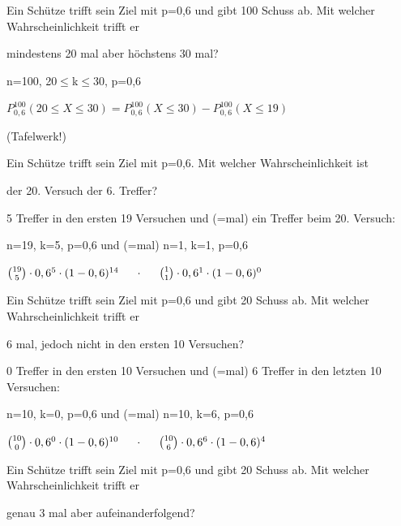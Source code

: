 \documentclass[paper=a6,landscape,ngerman,twoside=true,fontsize=12pt]{scrartcl}
\begin{document}
\begin{frage}
	\large
	Ein Schütze trifft sein Ziel mit p=0,6 und gibt 100 Schuss ab. Mit welcher Wahrscheinlichkeit trifft er 
	
	\LARGE 
	mindestens 20 mal aber höchstens 30 mal?
	
\end{frage}
\begin{antwort}
	n=100, 20$\leq$k$\leq$30, p=0,6
	
	\bigskip\large
	$P^{100}_{0,6}(20\leq X \leq30)=P^{100}_{0,6}(X\leq30)-P^{100}_{0,6}(X\leq19)$
	
	(Tafelwerk!)
	
\end{antwort}
\begin{frage}
	\large
	Ein Schütze trifft sein Ziel mit p=0,6. Mit welcher Wahrscheinlichkeit ist 
	
	\LARGE 
	der 20. Versuch der 6. Treffer?
	
\end{frage}
\begin{antwort}
	5 Treffer in den ersten 19 Versuchen und (=mal) ein Treffer beim 20. Versuch:
	
	n=19, k=5, p=0,6 und (=mal) n=1, k=1, p=0,6
	
	\bigskip
	$\binom{19}{5} \cdot 0,6^{5} \cdot (1-0,6)^{14} \hspace*{0.5cm}\cdot\hspace*{0.5cm} \binom{1}{1} \cdot 0,6^{1} \cdot (1-0,6)^{0}$
		
\end{antwort}
\begin{frage}
	\large
	Ein Schütze trifft sein Ziel mit p=0,6 und gibt 20 Schuss ab. Mit welcher Wahrscheinlichkeit trifft er  
	
	\LARGE 
	6 mal, jedoch nicht in den ersten 10 Versuchen?
	
\end{frage}
\begin{antwort}
	0 Treffer in den ersten 10 Versuchen und (=mal) 6 Treffer in den letzten 10 Versuchen:
	
	n=10, k=0, p=0,6 und (=mal) n=10, k=6, p=0,6
	
	\bigskip
	$\binom{10}{0} \cdot 0,6^{0} \cdot (1-0,6)^{10} \hspace*{0.5cm}\cdot\hspace*{0.5cm} \binom{10}{6} \cdot 0,6^{6} \cdot (1-0,6)^{4}$
	
\end{antwort}
\begin{frage}
	\large
	Ein Schütze trifft sein Ziel mit p=0,6 und gibt 20 Schuss ab. Mit welcher Wahrscheinlichkeit trifft er 
	
	\LARGE 
	genau 3 mal aber aufeinanderfolgend?
	
\end{frage}
\end{document}
